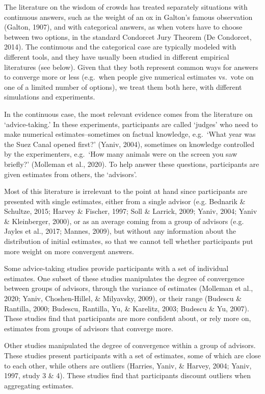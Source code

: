 \documentclass[
  doc,floatsintext]{apa6}
\begin{document}
The literature on the wisdom of crowds has treated separately situations with continuous answers, such as the weight of an ox in Galton's famous observation (Galton, 1907), and with categorical answers, as when voters have to choose between two options, in the standard Condorcet Jury Theorem (De Condorcet, 2014). The continuous and the categorical case are typically modeled with different tools, and they have usually been studied in different empirical literatures (see below). Given that they both represent common ways for answers to converge more or less (e.g.~when people give numerical estimates vs.~vote on one of a limited number of options), we treat them both here, with different simulations and experiments.

In the continuous case, the most relevant evidence comes from the literature on `advice-taking.' In these experiments, participants are called `judges' who need to make numerical estimates--sometimes on factual knowledge, e.g.~`What year was the Suez Canal opened first?' (Yaniv, 2004), sometimes on knowledge controlled by the experimenters, e.g.~`How many animals were on the screen you saw briefly?' (Molleman et al., 2020). To help answer these questions, participants are given estimates from others, the `advisors'.

Most of this literature is irrelevant to the point at hand since participants are presented with single estimates, either from a single advisor (e.g. Bednarik \& Schultze, 2015; Harvey \& Fischer, 1997; Soll \& Larrick, 2009; Yaniv, 2004; Yaniv \& Kleinberger, 2000), or as an average coming from a group of advisors (e.g. Jayles et al., 2017; Mannes, 2009), but without any information about the distribution of initial estimates, so that we cannot tell whether participants put more weight on more convergent answers.

Some advice-taking studies provide participants with a set of individual estimates. One subset of these studies manipulates the degree of convergence between groups of advisors, through the variance of estimates (Molleman et al., 2020; Yaniv, Choshen-Hillel, \& Milyavsky, 2009), or their range (Budescu \& Rantilla, 2000; Budescu, Rantilla, Yu, \& Karelitz, 2003; Budescu \& Yu, 2007). These studies find that participants are more confident about, or rely more on, estimates from groups of advisors that converge more.

Other studies manipulated the degree of convergence within a group of advisors. These studies present participants with a set of estimates, some of which are close to each other, while others are outliers (Harries, Yaniv, \& Harvey, 2004; Yaniv, 1997, study 3 \& 4). These studies find that participants discount outliers when aggregating estimates.
\end{document}
